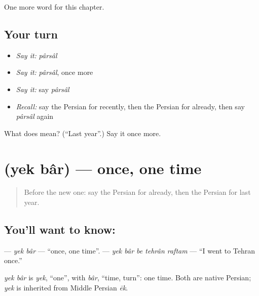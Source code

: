 \begin{grammarlens}[title={What you've built}]
One more word for this chapter.
\end{grammarlens}

\subsection*{Your turn}
\begin{itemize}
\raggedright
  \item \emph{Say it:} \emph{pârsâl}
  \item \emph{Say it:} \emph{pârsâl}, once more
  \item \emph{Say it:} say \emph{pârsâl}
  \item \emph{Recall:} say the Persian for recently, then the Persian for already, then say \emph{pârsâl} again
\end{itemize}

\begin{tcolorbox}[breakable,colback=teal!4,colframe=teal!35!black,title={Before you move on}]
What does  mean? (\textquotedblleft{}Last year\textquotedblright{}.) Say it once more.
\end{tcolorbox}
\section[\texorpdfstring{\fa{یک} \fa{بار} (yek bâr)}{یک بار (yek bâr)}]{  (yek bâr) — once, one time}

\label{lesson:FA-C137-yek-bar}



\begin{quote}
Before the new one: say the Persian for already, then the Persian for last year.
\end{quote}

\subsection*{You'll want to know:  }
\textbf{ } — \emph{yek bâr} — \textquotedblleft{}once, one time\textquotedblright{}. \textbf{    } — \emph{yek bâr be tehrân raftam} — \textquotedblleft{}I went to Tehran once.\textquotedblright{}

\begin{cousinweb}
\emph{yek bâr} is \emph{yek}, \textquotedblleft{}one\textquotedblright{}, with \emph{bâr}, \textquotedblleft{}time, turn\textquotedblright{}: one time. Both are native Persian; \emph{yek} is inherited from Middle Persian \emph{ēk}.
\end{cousinweb}


